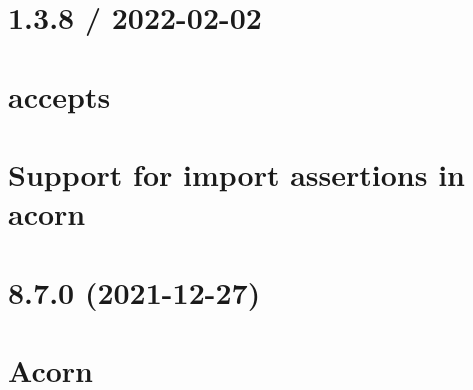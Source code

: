 \documentclass[twoside]{book}
\newcommand{\+}{\discretionary{\mbox{\scriptsize$\hookleftarrow$}}{}{}}
\begin{document}
\chapter{1.3.8 / 2022-\/02-\/02}
\label{md__c___users_vaishnavi_jadhav__desktop__developer_code_mean_stack_example_client_node_modules_accepts__h_i_s_t_o_r_y}

\chapter{accepts}
\label{md__c___users_vaishnavi_jadhav__desktop__developer_code_mean_stack_example_client_node_modules_accepts__r_e_a_d_m_e}

\chapter{Support for import assertions in acorn}
\label{md__c___users_vaishnavi_jadhav__desktop__developer_code_mean_stack_example_client_node_modules_a137ffbd52f45a4728e808af96a554080}

\chapter{8.7.0 (2021-\/12-\/27)}
\label{md__c___users_vaishnavi_jadhav__desktop__developer_code_mean_stack_example_client_node_modules_acorn__c_h_a_n_g_e_l_o_g}

\chapter{Acorn}
\label{md__c___users_vaishnavi_jadhav__desktop__developer_code_mean_stack_example_client_node_modules_acorn__r_e_a_d_m_e}

\end{document}
